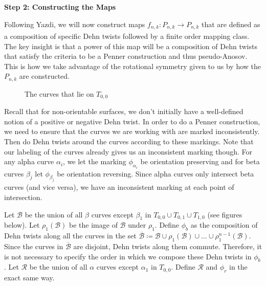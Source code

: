 \begin{center}
\textbf{Step 2: Constructing the Maps}
\end{center}


Following Yazdi, we will now construct maps $f_{n,k}: P_{n,k} \xrightarrow[]{} P_{n,k}$ that are defined as a composition of specific Dehn twists followed by a finite order mapping class. The key insight is that a power of this map will be a composition of Dehn twists that satisfy the criteria to be a Penner construction and thus pseudo-Anosov. This is how we take advantage of the rotational symmetry given to us by how the $P_{n,k}$ are constructed.

\begin{figure}[h]
    \centering
    \caption{The curves that lie on $T_{0,0}$}
    \label{fig:curves}
\end{figure}


Recall that for non-orientable surfaces, we don't initially have a well-defined notion of a positive or negative Dehn twist. In order to do a Penner construction, we need to ensure that the curves we are working with are marked inconsistently. Then do Dehn twists around the curves according to these markings. Note that our labeling of the curves already gives us an inconsistent marking though. For any alpha curve $\alpha_i$, we let the marking $\phi_{\alpha_i}$ be orientation preserving and for beta curves $\beta_j$ let $\phi_{\beta_j}$ be orientation reversing. Since alpha curves only intersect beta curves (and vice versa), we have an inconsistent marking at each point of intersection.

Let $\mathcal{B}$ be the union of all $\beta$ curves except $\beta_1$ in $T_{0,0} \cup T_{0,1} \cup T_{1,0}$ (see figures below). Let $\rho_1(\mathcal{B})$ be the image of $\mathcal{B}$ under $\rho_1$. Define $\phi_b$ as the composition of Dehn twists along all the curves in the set $\overline{\mathcal{B}} \coloneqq \mathcal{B} \cup \rho_1(\mathcal{B}) \cup \dots \cup \rho_1^{n-1}(\mathcal{B})$. Since the curves in $\overline{\mathcal{B}}$ are disjoint, Dehn twists along them commute. Therefore, it is not necessary to specify the order in which we compose these Dehn twists in $\phi_b$. Let $\mathcal{R}$ be the union of all $\alpha$ curves except $\alpha_1$ in $T_{0,0}$. Define $\mathcal{R}$ and $\phi_r$ in the exact same way.

